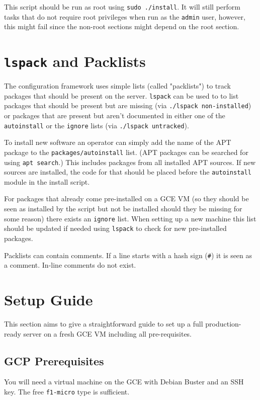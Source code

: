 \documentclass[12pt,a4paper]{report}
\begin{document}
	This script should be run as root using \lstinline|sudo ./install|. It will still perform tasks that do not require root privileges when run as the \lstinline|admin| user, however, this might fail since the non-root sections might depend on the root section.
	
	\section{\lstinline|lspack| and Packlists}
	The configuration framework uses simple lists (called "packlists") to track packages that should be present on the server. \lstinline|lspack| can be used to to list packages that should be present but are missing (via \lstinline|./lspack non-installed|) or packages that are present but aren't documented in either one of the \lstinline|autoinstall| or the \lstinline|ignore| lists (via \lstinline|./lspack untracked|).
	
	To install new software an operator can simply add the name of the APT package to the \lstinline|packages/autoinstall| list. (APT packages can be searched for using \lstinline|apt search|.) This includes packages from all installed APT sources. If new sources are installed, the code for that should be placed before the \lstinline|autoinstall| module in the install script.
	
	For packages that already come pre-installed on a GCE VM (so they should be seen as installed by the script but not be installed should they be missing for some reason) there exists an \lstinline|ignore| list. When setting up a new machine this list should be updated if needed using \lstinline|lspack| to check for new pre-installed packages.
	
	Packlists can contain comments. If a line starts with a hash sign (\lstinline|#|) it is seen as a comment. In-line comments do not exist.
	
	\pagebreak
	\section{Setup Guide}
	This section aims to give a straightforward guide to set up a full production-ready server on a fresh GCE VM including all pre-requisites.
	
	\subsection{GCP Prerequisites}
	You will need a virtual machine on the GCE with Debian Buster and an SSH key. The free \lstinline|f1-micro| type is sufficient.
	
\end{document}
